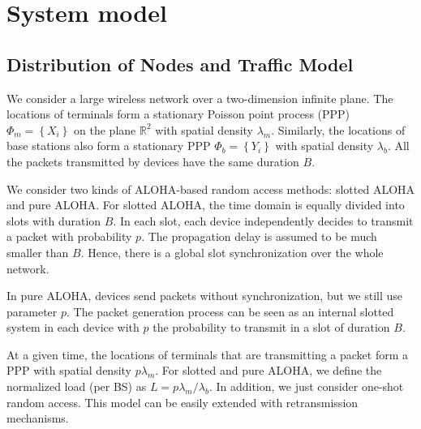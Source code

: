\section{System model}
\label{sec:system_model}
\subsection{Distribution of Nodes and Traffic Model}
We consider a large wireless network over a two-dimension infinite plane. The locations of terminals form a stationary Poisson point process (PPP) $\Phi_m = \left\lbrace X_i\right\rbrace$ on the plane $\mathbb{R}^2$ with spatial density $\lambda_m$.  Similarly, the locations of base stations also form a stationary PPP $\Phi_b = \left\lbrace Y_i\right\rbrace$ with spatial density $\lambda_b$. All the packets transmitted by devices have the same duration $B$.

We consider two kinds of ALOHA-based random access methods: slotted ALOHA and pure ALOHA. For slotted ALOHA, the time domain is equally divided into slots with duration $B$. In each slot, each device independently decides to transmit a packet with probability $p$. The propagation delay is assumed to be much smaller than $B$. Hence, there is a global slot synchronization over the whole network.

In pure ALOHA, devices send packets without synchronization, but we still use parameter $p$. The packet generation process can be seen as an internal slotted system in each device with $p$ the probability to transmit in a slot of duration $B$.

At a given time, the locations of terminals that are transmitting a packet form a PPP with spatial density $p\lambda_{m}$. For slotted and pure ALOHA, we define the normalized load (per BS) as $L = p\lambda_{m}/\lambda_{b}$. In addition, we just consider one-shot random access. This model can be easily extended with retransmission mechanisms.
